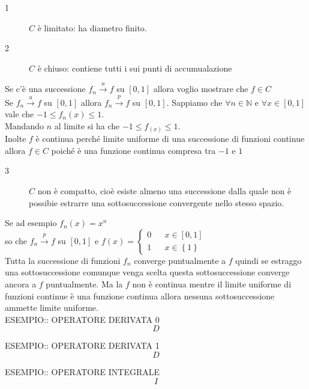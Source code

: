 \begin{description}
	\item[1] $C$ è limitato: ha diametro finito.
	\item[2] $C$ è chiuso: contiene tutti i sui punti di accumualazione
\end{description}
Se c'è una successione $f_n\overset{u}{\to}f$ su $\left[0,1\right]$ allora voglio mostrare che $f\in C$\\
Se $f_n\overset{u}{\to}f$ su $\left[0,1\right]$ allora $f_n\overset{p}{\to}f$ su $\left[0,1\right]$.
Sappiamo che $\forall n\in\mathbb{N}$ e $\forall x\in \left[0,1\right]$ vale che $-1\le f_n(x)\le 1$.\\
Mandando $n$ al limite si ha che $-1\le f_(x)\le 1$.\\
Inolte $f$ è continua perché limite uniforme di una successione di funzioni continue allora $f\in C$ poiché è una funzione continua compresa tra $-1$ e $1$
\begin{description}
	\item[3] $C$ non è compatto, cioè esiste almeno una successione dalla quale non è possibie estrarre una sottosuccessione convergente nello stesso spazio.
\end{description}
Se ad esempio $f_n(x) = x^n$\\
so che $f_n\overset{p}{\to}f$ su $\left[0,1\right]$ e $f(x)=\left\{\begin{matrix}0&&x\in\left[0,1\right]\\1&&x\in\left\{1\right\}\end{matrix}\right.$\\
Tutta la successione di funzioni $f_n$ converge puntualmente a $f$ quindi se estraggo una sottosuccessione comunque venga scelta questa sottosuccessione converge ancora a $f$ puntualmente. Ma la $f$ non è continua mentre il limite uniforme di funzioni continue è una funzione continua allora nessuna sottosuccessione ammette limite uniforme.\\

ESEMPIO:: OPERATORE DERIVATA 0\\
$$D$$

ESEMPIO:: OPERATORE DERIVATA 1\\
$$D$$

ESEMPIO:: OPERATORE INTEGRALE\\
$$I$$

